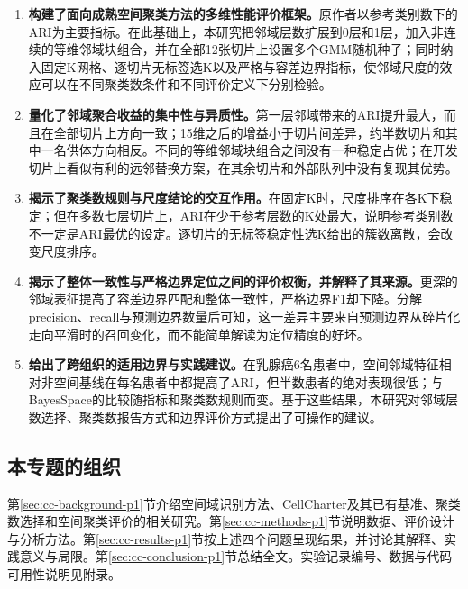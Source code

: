 \begin{enumerate}
  \item \textbf{构建了面向成熟空间聚类方法的多维性能评价框架。}原作者以参考类别数下的ARI为主要指标。在此基础上，本研究把邻域层数扩展到0层和1层，加入非连续的等维邻域块组合，并在全部12张切片上设置多个GMM随机种子；同时纳入固定K网格、逐切片无标签选K以及严格与容差边界指标，使邻域尺度的效应可以在不同聚类数条件和不同评价定义下分别检验。
  \item \textbf{量化了邻域聚合收益的集中性与异质性。}第一层邻域带来的ARI提升最大，而且在全部切片上方向一致；15维之后的增益小于切片间差异，约半数切片和其中一名供体方向相反。不同的等维邻域块组合之间没有一种稳定占优；在开发切片上看似有利的远邻替换方案，在其余切片和外部队列中没有复现其优势。
  \item \textbf{揭示了聚类数规则与尺度结论的交互作用。}在固定K时，尺度排序在各K下稳定；但在多数七层切片上，ARI在少于参考层数的K处最大，说明参考类别数不一定是ARI最优的设定。逐切片的无标签稳定性选K给出的簇数离散，会改变尺度排序。
  \item \textbf{揭示了整体一致性与严格边界定位之间的评价权衡，并解释了其来源。}更深的邻域表征提高了容差边界匹配和整体一致性，严格边界F1却下降。分解precision、recall与预测边界数量后可知，这一差异主要来自预测边界从碎片化走向平滑时的召回变化，而不能简单解读为定位精度的好坏。
  \item \textbf{给出了跨组织的适用边界与实践建议。}在乳腺癌6名患者中，空间邻域特征相对非空间基线在每名患者中都提高了ARI，但半数患者的绝对表现很低；与BayesSpace的比较随指标和聚类数规则而变。基于这些结果，本研究对邻域层数选择、聚类数报告方式和边界评价方式提出了可操作的建议。
\end{enumerate}

\subsection{本专题的组织}
第\ref{sec:cc-background-p1}节介绍空间域识别方法、CellCharter及其已有基准、聚类数选择和空间聚类评价的相关研究。第\ref{sec:cc-methods-p1}节说明数据、评价设计与分析方法。第\ref{sec:cc-results-p1}节按上述四个问题呈现结果，并讨论其解释、实践意义与局限。第\ref{sec:cc-conclusion-p1}节总结全文。实验记录编号、数据与代码可用性说明见附录。
